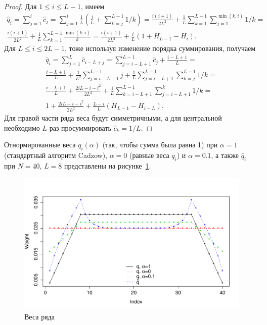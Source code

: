 \documentclass[12pt,a4paper,fleqn,leqno]{article}
\begin{document}
\begin{proof}
Для $1 \le i \le L-1$, имеем
\begin{gather*}
\hat{q}_i = \sum_{j=1}^i \hat{c}_j = \sum_{j=1}^i \frac{1}{L}\left(\frac{j}{L} + \sum_{k=j}^{L-1}1/k\right) =
\frac{i(i+1)}{2L^2}+\frac{1}{L} \sum_{k = 1}^{L-1} \sum_{j=1}^{\min(k,i)} 1/k =\\ \frac{i(i+1)}{2L^2}+\frac{1}{L} \sum_{k = 1}^{L-1} \frac{\min(k,i)}{k} = \frac{i(i+1)}{2 L^2} + \frac{i}{L}(1 + H_{L-1} - H_i).
\end{gather*}
Для $L \le i \le 2L-1$, тоже используя изменение порядка суммирования, получаем
\begin{gather*}
\hat{q}_i = \sum_{j = 1}^L \hat{c}_{i-L+j} = \sum_{j = i - L + 1}^{L - 1} \hat{c}_j + \frac{i - L + 1}{L} =\\
\frac{i - L + 1}{L} + \frac{1}{L^2} \sum_{j = i - L + 1}^{L-1}j + \frac{1}{L} \sum_{j = i-L + 1}^{L-1} \sum_{k=j}^{L-1}1/k =\\ \frac{i - L + 1}{L} + \frac{2iL - i - i^2}{2L^2} + \frac{1}{L} \sum_{k = i - L + 1}^{L - 1} \sum_{j = i - L + 1}^k 1/k =\\
1 + \frac{2iL-i-i^2}{2L^2} + \frac{L-i}{L}(H_{L-1} - H_{i - L}).
\end{gather*}
Для правой части ряда веса будут симметричными, а для центральной необходимо $L$ раз просуммировать $\hat{c}_k = 1/L$.
\end{proof}

Отнормированные веса $q_i(\alpha)$ (так, чтобы сумма была равна 1) при $\alpha = 1$ (стандартный алгоритм Cadzow), $\alpha = 0$ (равные веса $q_i$) и $\alpha = 0.1$,
 а также $\hat{q}_i$ при $N = 40$, $L = 8$ представлены на рисунке~\ref{img_weights}.
\begin{figure}[!h] \begin{center}
\includegraphics[width = 15cm]{weights.pdf}\caption{Веса ряда}\label{img_weights}
\end{center}\end{figure}
\end{document}
